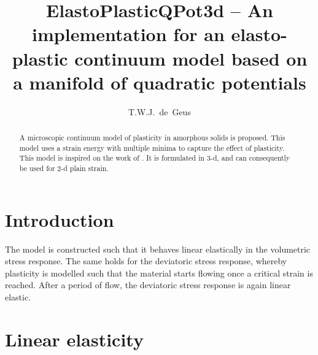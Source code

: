 \documentclass[times,namecite]{goose-article}
\title{%
  ElastoPlasticQPot3d -- An implementation for an elasto-plastic continuum model based on a manifold of quadratic potentials
}
\author{T.W.J.~de~Geus}
\begin{document}
\maketitle

\begin{abstract}
A microscopic continuum model of plasticity in amorphous solids is proposed. This model uses a strain energy with multiple minima to capture the effect of plasticity. This model is inspired on the work of \citet{Jagla2017}. It is formulated in 3-d, and can consequently be used for 2-d plain strain.
\end{abstract}


\setcounter{tocdepth}{3}
\tableofcontents

\vfill\newpage
\section{Introduction}

The model is constructed such that it behaves linear elastically in the volumetric stress response. The same holds for the deviatoric stress response, whereby plasticity is modelled such that the material starts flowing once a critical strain is reached. After a period of flow, the deviatoric stress response is again linear elastic.

\section{Linear elasticity}
\end{document}
